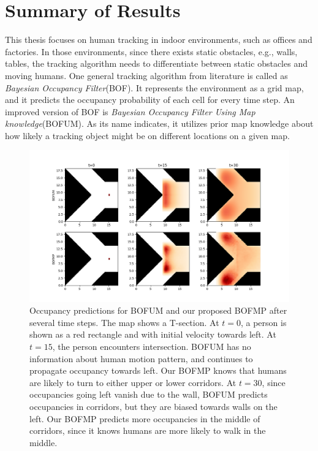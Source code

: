 \chapter{Summary of Results}

This thesis focuses on human tracking in indoor environments, such as offices and factories. In those environments, since there exists static obstacles, e.g., walls, tables, the tracking algorithm needs to differentiate between static obstacles and moving humans. One general tracking algorithm from literature is called as \textit{Bayesian Occupancy Filter}(BOF). It represents the environment as a grid map, and it predicts the occupancy probability of each cell for every time step. An improved version of BOF is \textit{Bayesian Occupancy Filter Using Map knowledge}(BOFUM). As its name indicates, it utilizes prior map knowledge about how likely a tracking object might be on different locations on a given map. 

\begin{figure}[ht]
  \centering
    \includegraphics[width=\textwidth]{figures/idea.png}
    \caption{Occupancy predictions for BOFUM and our proposed BOFMP after several time steps. The map shows a T-section. At $t=0$, a person is shown as a red rectangle and with initial velocity towards left. At $t=15$, the person encounters intersection. BOFUM has no information about human motion pattern, and continues to propagate occupancy towards left. Our BOFMP knows that humans are likely to turn to either upper or lower corridors. At $t=30$, since occupancies going left vanish due to the wall, BOFUM predicts occupancies in corridors, but they are biased towards walls on the left. Our BOFMP predicts more occupancies in the middle of corridors, since it knows humans are more likely to walk in the middle.}
    \label{fig:idea}
\end{figure}

